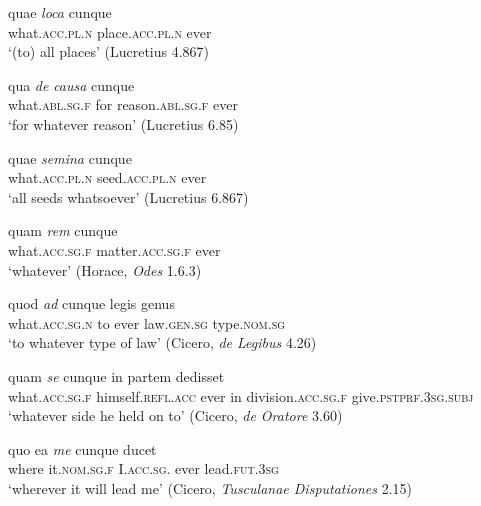 \begin{exe}
\ex
\gll quae \emph{loca} cunque\\
what.\textsc{acc.pl.n} place.\textsc{acc.pl.n} ever\\
\trans `(to) all places' (Lucretius 4.867)
\label{quicumque3}
\end{exe}%

\begin{exe}
\ex
\gll qua \emph{de} \emph{causa} cunque\\
what.\textsc{abl.sg.f} for reason.\textsc{abl.sg.f} ever\\
\trans `for whatever reason' (Lucretius 6.85)
\label{quicumque4}
\end{exe}

\begin{exe}
\ex
\gll quae \emph{semina} cunque\\
what.\textsc{acc.pl.n} seed.\textsc{acc.pl.n} ever\\
\trans `all seeds whatsoever' (Lucretius 6.867)
\label{quicumque5}
\end{exe}

\begin{exe}
\ex
\gll quam \emph{rem} cunque\\
what.\textsc{acc.sg.f} matter.\textsc{acc.sg.f} ever\\
\trans `whatever' (Horace, \textit{Odes} 1.6.3)
\label{quicumque6}
\end{exe}

\begin{exe}
\ex
\gll quod \emph{ad} cunque legis genus\\
what.\textsc{acc.sg.n} to ever law.\textsc{gen.sg} type.\textsc{nom.sg}\\
\trans `to whatever type of law' (Cicero, \textit{de Legibus} 4.26)
\label{quicumque7}
\end{exe}

\begin{exe}
\ex
\gll quam \emph{se} cunque in partem dedisset\\
what.\textsc{acc.sg.f} himself.\textsc{refl.acc} ever in division.\textsc{acc.sg.f} give.\textsc{pstprf.3sg.subj}\\
\trans `whatever side he held on to' (Cicero, \textit{de Oratore} 3.60)
\label{quicumque8}
\end{exe}

\begin{exe}
\ex
\gll quo ea \emph{me} cunque ducet\\
where it.\textsc{nom.sg.f} I.\textsc{acc.sg.} ever lead.\textsc{fut.3sg}\\
\trans `wherever it will lead me' (Cicero, \textit{Tusculanae Disputationes} 2.15)
\label{quicumque9}
\end{exe}

